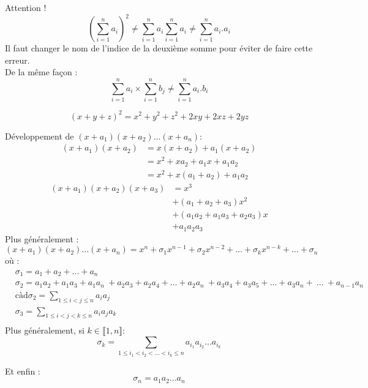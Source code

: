 \documentclass[a4paper,11pt]{article}
\newcommand{\intN}[2]{\llbracket #1, #2 \rrbracket}
\newcommand{\encadLEQ}[3]{#1 \leq #2 \leq #3}
\begin{document}
\begin{remarque}
	Attention ! 
	$$(\sum_{i=1}^{n}a_i)^2 \neq \sum_{i=1}^{n}a_i \sum_{i=1}^{n}a_i \neq \sum_{i=1}^{n}a_i.a_i$$
	Il faut changer le nom de l'indice de la deuxième somme pour éviter de faire cette erreur.\\
	De la même façon :
	$$\sum_{i=1}^{n}a_i \times \sum_{i=1}^{n}b_j \neq \sum_{i=1}^{n}a_i.b_i$$
\end{remarque}

\newpage

\begin{exemples}
	$$(x + y + z)^2 = x^2 + y^2 + z^2 + 2xy + 2xz + 2yz$$
\end{exemples}

\begin{exemples}
	Développement de $(x + a_1)(x + a_2)...(x + a_n)$:
	\begin{align*}
		(x + a_1)(x + a_2) &= x(x + a_2) + a_1(x + a_2) \\
		&= x^2 + xa_2 + a_1x + a_1a_2 \\
		&= x^2 + x(a_1 + a_2) + a_1a_2
	\end{align*}
	\begin{align*}
		(x + a_1)(x + a_2)(x + a_3) &= x^3\\
		&+ (a_1 + a_2 + a_3)x^2 \\
		&+ (a_1a_2 + a_1a_3 + a_2a_3)x \\
		&+ a_1a_2a_3
	\end{align*}
	Plus généralement :
	$$(x + a_1)(x + a_2)...(x + a_n) = x^n + \sigma_1 x^{n-1} + \sigma_2 x^{n-2} + ... + \sigma_k x^{n - k} + ... + \sigma_n$$
	où :
	\begin{align*}
		& \sigma_1 = a_1 + a_2 + ... + a_n \\
		& \sigma_2 = a_1a_2 + a_1a_3 + a_1a_n \: + a_2a_3 + a_2a_4 + ... + a_2a_n \: + a_3a_4 + a_3a_5 + ... + a_3a_n + \: ... \: + a_{n-1}a_n \\
		&\text{càd} \sigma_2 = \sum_{\encadLEQ{1}{i < j}{n}}a_ia_j \\
		&\sigma_3 = \sum_{\encadLEQ{1}{i < j < k}{n}}a_ia_ja_k \\		
	\end{align*}
	Plus généralement, si $k \in\intN{1}{n}$:
	$$\sigma_k = \sum_{\encadLEQ{1}{i_1 < i_2 < ... < i_k}{n}}a_{i_1}a_{i_2}...a_{i_k}$$
	
	Et enfin :
	$$\sigma_n = a_1a_2...a_n$$
\end{exemples}

\newpage
\end{document}
